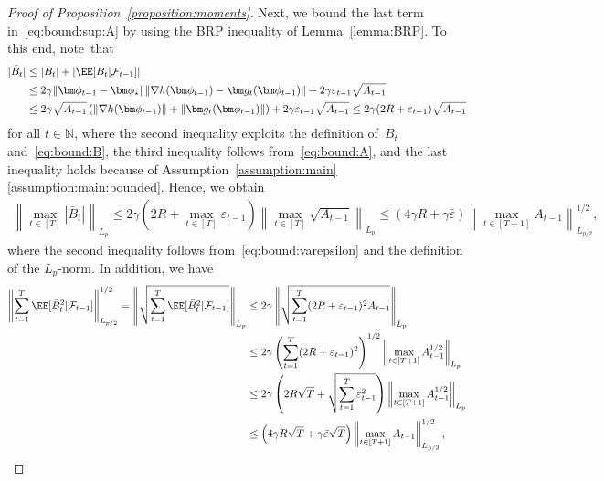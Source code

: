 \documentclass[11pt, a4paper, oneside, reqno]{article}
\begin{document}
\begin{proof}[Proof of Proposition~\ref{proposition:moments}]
		Next, we bound the last term in~\eqref{eq:bound:sup:A} by using the BRP inequality of Lemma~\ref{lemma:BRP}. To this end, note~that
		\begin{align*}
		|\bar B_t | 
		& \leq | B_t | + | \EE[B_t | \mathcal F_{t-1}] | \\
		&\leq 2 \gamma \| \bm \phi_{t-1} - \bm \phi_{\star} \| \| \nabla h(\bm \phi_{t-1}) - \bm g_t(\bm \phi_{t-1}) \| +  2 \gamma \varepsilon_{t-1} \sqrt{A_{t-1}} \\
		&\leq 2 \gamma \sqrt{A_{t-1}} \left( \| \nabla h(\bm \phi_{t-1}) \| + \| \bm g_t(\bm \phi_{t-1}) \| \right) +  2 \gamma \varepsilon_{t-1} \sqrt{A_{t-1}}
		\leq 2 \gamma (2R + \varepsilon_{t-1}) \sqrt{A_{t-1}}
		\end{align*}
		for all $t\in\mathbb N$, where the second inequality exploits the definition of~$B_t$ and~\eqref{eq:bound:B}, the third inequality follows from~\eqref{eq:bound:A}, and the last inequality holds because of Assumption~\ref{assumption:main}\,\ref{assumption:main:bounded}. Hence, we obtain
		\begin{align*}
		\textstyle
		\left\| \max_{t \in [T]} | \bar B_t | \right\|_{L_p} 
		\leq 2 \gamma \left( 2 R + \max_{t \in [T]} \varepsilon_{t-1} \right) \left\| \max_{t \in [T]} \sqrt{A_{t-1}} \right\|_{L_p} 
		\leq ( 4 \gamma R + \gamma \bar \varepsilon) \left\| \max_{t \in [T+1]} A_{t-1} \right\|_{L_{p/2}}^{1/2},
		\end{align*}
		where the second inequality follows from~\eqref{eq:bound:varepsilon} and the definition of the $L_p$-norm. In addition, we have
		\begin{align*}
		\left\| \sum_{t=1}^T \EE[ \bar B_t^2 | \mathcal F_{t-1}] \right\|_{L_{p/2}}^{1/2} 
		= \left\| \sqrt{\sum_{t=1}^T \EE[ \bar B_t^2 | \mathcal F_{t-1}]} \right\|_{L_p}
		&\leq 2 \gamma \left\| \sqrt{ \sum_{t=1}^T (2R + \varepsilon_{t-1})^2 A_{t-1} } \right\|_{L_p} \\
		&\leq 2 \gamma \left( \sum_{t=1}^T (2R + \varepsilon_{t-1})^2 \right)^{1/2}
		\left\| \max_{t \in [T+1]} A_{t-1}^{1/2} \right\|_{L_p} \\
		&\leq 2 \gamma \left( 2 R \sqrt{T} +  \sqrt{\sum_{t=1}^T \varepsilon_{t-1}^2} \right)
		\left\| \max_{t \in [T+1]} A_{t-1}^{1/2} \right\|_{L_p} \\
		&\leq \left( 4 \gamma R \sqrt{T} + \gamma \bar \varepsilon \sqrt{T} \right) \left\| \max_{t \in [T+1]} A_{t-1} \right\|_{L_{p/2}}^{1/2},

\end{align*}
\end{proof}
\end{document}
